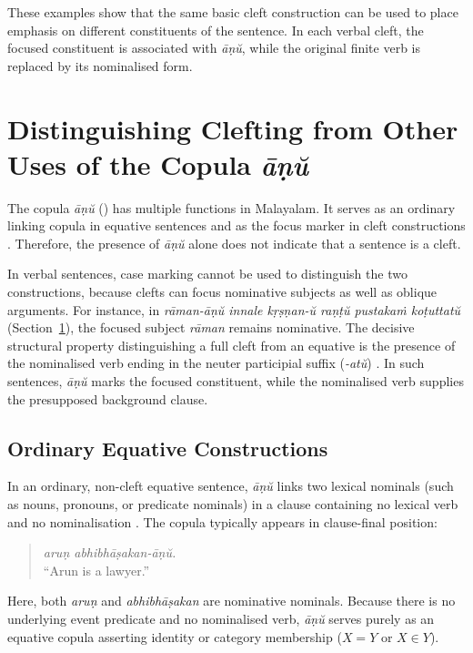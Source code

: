 These examples show that the same basic cleft construction can be used to place emphasis on different constituents of the sentence. In each verbal cleft, the focused constituent is associated with \textit{āṇŭ}, while the original finite verb is replaced by its nominalised form.

\section{Distinguishing Clefting from Other Uses of the Copula \textit{āṇŭ}}
\label{sec:distinguishing_clefting}

The copula \textit{āṇŭ} () has multiple functions in Malayalam. It serves as an ordinary linking copula in equative sentences and as the focus marker in cleft constructions \citep{asher1997malayalam,moag2002malayalam,mohanan1999two,jayaseelan2001ip}. Therefore, the presence of \textit{āṇŭ} alone does not indicate that a sentence is a cleft.

In verbal sentences, case marking cannot be used to distinguish the two constructions, because clefts can focus nominative subjects as well as oblique arguments. For instance, in \textit{rāman-āṇŭ innale kṛṣṇan-ŭ raṇṭŭ pustakaṁ koṭuttatŭ} (Section~\ref{sec:distinguishing_clefting}), the focused subject \textit{rāman} remains nominative. The decisive structural property distinguishing a full cleft from an equative is the presence of the nominalised verb ending in the neuter participial suffix  (\textit{-atŭ}) \citep{asher1997malayalam,moag2002malayalam,mohanan1999two}. In such sentences, \textit{āṇŭ} marks the focused constituent, while the nominalised verb supplies the presupposed background clause.

\subsection{Ordinary Equative Constructions}
\label{sec:ordinary_equatives}

In an ordinary, non-cleft equative sentence, \textit{āṇŭ} links two lexical nominals (such as nouns, pronouns, or predicate nominals) in a clause containing no lexical verb and no nominalisation \citep{mohanan1999two}. The copula typically appears in clause-final position:
\begin{quote}
\textit{aruṇ abhibhāṣakan-āṇŭ.}\\
``Arun is a lawyer.''
\end{quote}
Here, both \textit{aruṇ} and \textit{abhibhāṣakan} are nominative nominals. Because there is no underlying event predicate and no nominalised verb, \textit{āṇŭ} serves purely as an equative copula asserting identity or category membership ($X = Y$ or $X \in Y$).

